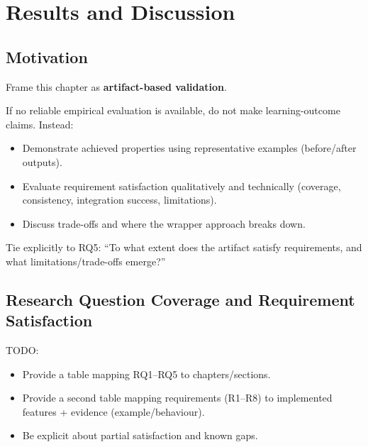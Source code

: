 \documentclass[
	bibliography=totoc,
	listof=totoc,
]{scrbook}
\begin{document}
\pagebreak %
\chapter{Results and Discussion} %
\section*{Motivation} %

\begin{justify}
Frame this chapter as \textbf{artifact-based validation}.

If no reliable empirical evaluation is available, do not make learning-outcome claims. Instead:
\begin{itemize}
    \item Demonstrate achieved properties using representative examples (before/after outputs).
    \item Evaluate requirement satisfaction qualitatively and technically (coverage, consistency, integration success, limitations).
    \item Discuss trade-offs and where the wrapper approach breaks down.
\end{itemize}

Tie explicitly to RQ5: ``To what extent does the artifact satisfy requirements, and what limitations/trade-offs emerge?''
\end{justify}


\section{Research Question Coverage and Requirement Satisfaction}

\begin{marker}\begin{justify}
TODO:
\begin{itemize}
    \item Provide a table mapping RQ1--RQ5 to chapters/sections.
    \item Provide a second table mapping requirements (R1--R8) to implemented features + evidence (example/behaviour).
    \item Be explicit about partial satisfaction and known gaps.
\end{itemize}
\end{justify}\end{marker}
\end{document}
